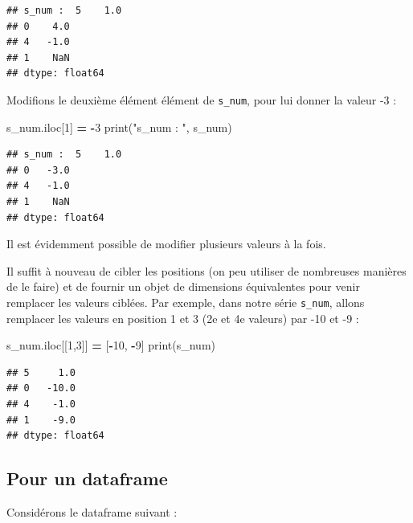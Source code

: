 \documentclass[
  12pt,
]{book}
\newenvironment{Shaded}{\begin{snugshade}}{\end{snugshade}}
\newcommand{\BuiltInTok}[1]{#1}
\newcommand{\DecValTok}[1]{\textcolor[rgb]{0.00,0.00,0.81}{#1}}
\newcommand{\NormalTok}[1]{#1}
\newcommand{\OperatorTok}[1]{\textcolor[rgb]{0.81,0.36,0.00}{\textbf{#1}}}
\newcommand{\StringTok}[1]{\textcolor[rgb]{0.31,0.60,0.02}{#1}}
\numberwithin{equation}{section}
\numberwithin{countremarque}{section}
\begin{document}
\begin{lstlisting}
## s_num :  5    1.0
## 0    4.0
## 4   -1.0
## 1    NaN
## dtype: float64
\end{lstlisting}

Modifions le deuxième élément élément de \texttt{s\_num}, pour lui donner la valeur -3 :

\begin{Shaded}
\begin{Highlighting}[]
\NormalTok{s\_num.iloc[}\DecValTok{1}\NormalTok{] }\OperatorTok{=} \OperatorTok{{-}}\DecValTok{3}
\BuiltInTok{print}\NormalTok{(}\StringTok{"s\_num : "}\NormalTok{, s\_num)}
\end{Highlighting}
\end{Shaded}

\begin{lstlisting}
## s_num :  5    1.0
## 0   -3.0
## 4   -1.0
## 1    NaN
## dtype: float64
\end{lstlisting}

Il est évidemment possible de modifier plusieurs valeurs à la fois.

Il suffit à nouveau de cibler les positions (on peu utiliser de nombreuses manières de le faire) et de fournir un objet de dimensions équivalentes pour venir remplacer les valeurs ciblées. Par exemple, dans notre série \texttt{s\_num}, allons remplacer les valeurs en position 1 et 3 (2e et 4e valeurs) par -10 et -9 :

\begin{Shaded}
\begin{Highlighting}[]
\NormalTok{s\_num.iloc[[}\DecValTok{1}\NormalTok{,}\DecValTok{3}\NormalTok{]] }\OperatorTok{=}\NormalTok{ [}\OperatorTok{{-}}\DecValTok{10}\NormalTok{, }\OperatorTok{{-}}\DecValTok{9}\NormalTok{]}
\BuiltInTok{print}\NormalTok{(s\_num)}
\end{Highlighting}
\end{Shaded}

\begin{lstlisting}
## 5     1.0
## 0   -10.0
## 4    -1.0
## 1    -9.0
## dtype: float64
\end{lstlisting}

\subsection{Pour un dataframe}\label{pour-un-dataframe}

Considérons le dataframe suivant :
\end{document}
